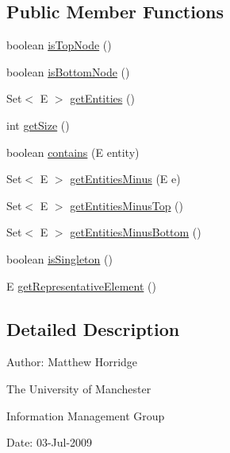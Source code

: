 \subsection*{Public Member Functions}
\begin{DoxyCompactItemize}
\item 
boolean \hyperlink{interfaceorg_1_1semanticweb_1_1owlapi_1_1reasoner_1_1_node_3_01_e_01extends_01_o_w_l_object_01_4_ad5ca51c94b170eceaeaf53ca3339d501}{is\-Top\-Node} ()
\item 
boolean \hyperlink{interfaceorg_1_1semanticweb_1_1owlapi_1_1reasoner_1_1_node_3_01_e_01extends_01_o_w_l_object_01_4_a8bd280b9f58ea2a4bb677682a69e6d7e}{is\-Bottom\-Node} ()
\item 
Set$<$ E $>$ \hyperlink{interfaceorg_1_1semanticweb_1_1owlapi_1_1reasoner_1_1_node_3_01_e_01extends_01_o_w_l_object_01_4_aa23540f57baa1803e015299b44c5e269}{get\-Entities} ()
\item 
int \hyperlink{interfaceorg_1_1semanticweb_1_1owlapi_1_1reasoner_1_1_node_3_01_e_01extends_01_o_w_l_object_01_4_aa9aab031ff6705f2fc83ec631be9cd69}{get\-Size} ()
\item 
boolean \hyperlink{interfaceorg_1_1semanticweb_1_1owlapi_1_1reasoner_1_1_node_3_01_e_01extends_01_o_w_l_object_01_4_afe6ad3a743a2283339bc6a9fe28b66ab}{contains} (E entity)
\item 
Set$<$ E $>$ \hyperlink{interfaceorg_1_1semanticweb_1_1owlapi_1_1reasoner_1_1_node_3_01_e_01extends_01_o_w_l_object_01_4_abca8f89676c11e8317b113ddbffcfcd7}{get\-Entities\-Minus} (E e)
\item 
Set$<$ E $>$ \hyperlink{interfaceorg_1_1semanticweb_1_1owlapi_1_1reasoner_1_1_node_3_01_e_01extends_01_o_w_l_object_01_4_ae77b3136c87a996c14652f5bb88e2d75}{get\-Entities\-Minus\-Top} ()
\item 
Set$<$ E $>$ \hyperlink{interfaceorg_1_1semanticweb_1_1owlapi_1_1reasoner_1_1_node_3_01_e_01extends_01_o_w_l_object_01_4_ad8b1aa8da815f16cdf869b7741cb364d}{get\-Entities\-Minus\-Bottom} ()
\item 
boolean \hyperlink{interfaceorg_1_1semanticweb_1_1owlapi_1_1reasoner_1_1_node_3_01_e_01extends_01_o_w_l_object_01_4_a38ddd9706637f785d0ccc7c865f8ee81}{is\-Singleton} ()
\item 
E \hyperlink{interfaceorg_1_1semanticweb_1_1owlapi_1_1reasoner_1_1_node_3_01_e_01extends_01_o_w_l_object_01_4_afab442c5ec023d12d1bf8ba50d1fa296}{get\-Representative\-Element} ()
\end{DoxyCompactItemize}


\subsection{Detailed Description}
Author\-: Matthew Horridge\par
 The University of Manchester\par
 Information Management Group\par
 Date\-: 03-\/\-Jul-\/2009 

